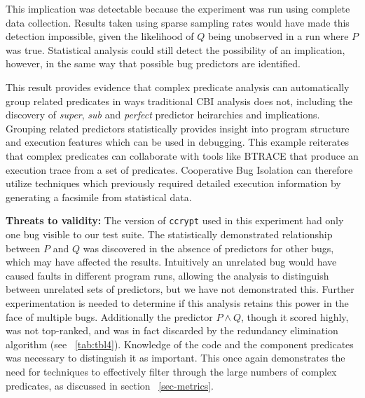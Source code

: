 This implication was detectable because the experiment was run using complete data collection.  Results taken using sparse sampling rates would have made this detection impossible, given the likelihood of $Q$ being unobserved in a run where $P$ was true.  Statistical analysis could still detect the possibility of an implication, however, in the same way that possible bug predictors are identified.

This result provides evidence that complex predicate analysis can automatically group related predicates in ways traditional CBI analysis does not, including the discovery of \textit{super}, \textit{sub} and \textit{perfect} predictor heirarchies and implications.  Grouping related predictors statistically provides insight into program structure and execution features which can be used in debugging.  This example reiterates that complex predicates can collaborate with tools like BTRACE that produce an execution trace from a set of predicates.  Cooperative Bug Isolation can therefore utilize techniques which previously required detailed execution information by generating a facsimile from statistical data.

\vspace{4pt} \noindent
{\bf Threats to validity:}
The version of \texttt{ccrypt} used in this experiment had only one bug visible to our test suite.  The statistically demonstrated relationship between $P$ and $Q$ was discovered in the absence of predictors for other bugs, which may have affected the results.  Intuitively an unrelated bug would have caused faults in different program runs, allowing the analysis to distinguish between unrelated sets of predictors, but we have not demonstrated this.  Further experimentation is needed to determine if this analysis retains this power in the face of multiple bugs.  Additionally the predictor $P \wedge Q$, though it scored highly, was not top-ranked, and was in fact discarded by the redundancy elimination algorithm (see ~\autoref{tab:tbl4}).  Knowledge of the code and the component predicates was necessary to distinguish it as important.  This once again demonstrates the need for techniques to effectively filter through the large numbers of complex predicates, as discussed in section ~\ref{sec-metrics}.

